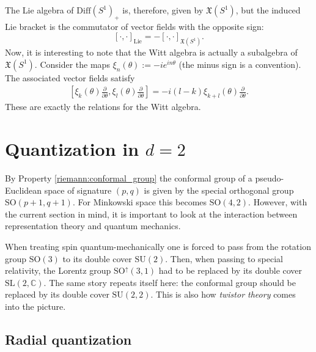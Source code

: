     The Lie algebra of $\mathrm{Diff}(S^1)_+$ is, therefore, given by $\mathfrak{X}(S^1)$, but the induced Lie bracket is the commutator of vector fields with the opposite sign: \[[\cdot,\cdot]_\mathrm{Lie} = -[\cdot,\cdot]_{\mathfrak{X}(S^1)}.\] Now, it is interesting to note that the Witt algebra is actually a subalgebra of $\mathfrak{X}(S^1)$. Consider the maps $\xi_n(\theta):=-ie^{in\theta}$ (the minus sign is a convention). The associated vector fields satisfy
    \begin{gather}
        \left[\xi_k(\theta)\frac{\partial}{\partial\theta}, \xi_l(\theta)\frac{\partial}{\partial\theta}\right] = -i(l-k)\xi_{k+l}(\theta)\frac{\partial}{\partial\theta}.
    \end{gather}
    These are exactly the relations for the Witt algebra.

\section{\texorpdfstring{Quantization in $d=2$}{Quantization in d = 2}}

    By Property \ref{riemann:conformal_group} the conformal group of a pseudo-Euclidean space of signature $(p,q)$ is given by the special orthogonal group $\mathrm{SO}(p+1,q+1)$. For Minkowski space this becomes $\mathrm{SO}(4,2)$. However, with the current section in mind, it is important to look at the interaction between representation theory and quantum mechanics.

    When treating spin quantum-mechanically one is forced to pass from the rotation group $\mathrm{SO}(3)$ to its double cover $\mathrm{SU}(2)$. Then, when passing to special relativity, the Lorentz group $\mathrm{SO}^\uparrow(3,1)$ had to be replaced by its double cover $\mathrm{SL}(2,\mathbb{C})$. The same story repeats itself here: the conformal group should be replaced by its double cover $\mathrm{SU}(2,2)$. This is also how \textit{twistor theory} comes into the picture.

\subsection{Radial quantization}

